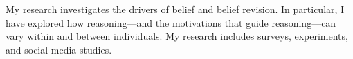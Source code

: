 

\begin{small} \color{black}
My research investigates the drivers of belief and belief revision. In particular, I have explored how reasoning---and the motivations that guide reasoning---can vary within and between individuals. My research includes surveys, experiments, and social media studies.
\end{small}

